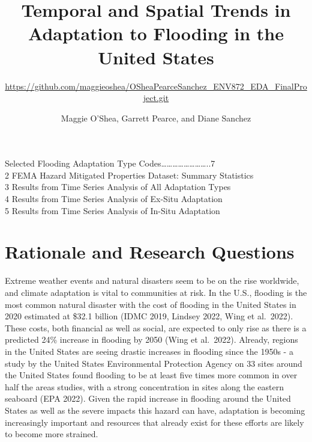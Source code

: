 \documentclass[
  12pt,
]{article}
\title{Temporal and Spatial Trends in Adaptation to Flooding in the
United States}
\subtitle{\url{https://github.com/maggieoshea/OSheaPearceSanchez_ENV872_EDA_FinalProject.git}}
\author{Maggie O'Shea, Garrett Pearce, and Diane Sanchez}
\date{}
\begin{document}
\maketitle

\newpage
\tableofcontents 
\newpage
{}

Selected Flooding Adaptation Type
Codes\ldots\ldots\ldots\ldots\ldots\ldots\ldots\ldots..7\\
2 FEMA Hazard Mitigated Properties Dataset: Summary Statistics\\
3 Results from Time Series Analysis of All Adaptation Types\\
4 Results from Time Series Analysis of Ex-Situ Adaptation\\
5 Results from Time Series Analysis of In-Situ Adaptation \newpage

\listoffigures 
\newpage

\newpage

\hypertarget{rationale-and-research-questions}{%
\section{Rationale and Research
Questions}\label{rationale-and-research-questions}}

Extreme weather events and natural disasters seem to be on the rise
worldwide, and climate adaptation is vital to communities at risk. In
the U.S., flooding is the most common natural disaster with the cost of
flooding in the United States in 2020 estimated at \$32.1 billion (IDMC
2019, Lindsey 2022, Wing et al.~2022). These costs, both financial as
well as social, are expected to only rise as there is a predicted 24\%
increase in flooding by 2050 (Wing et al.~2022). Already, regions in the
United States are seeing drastic increases in flooding since the 1950s -
a study by the United States Environmental Protection Agency on 33 sites
around the United States found flooding to be at least five times more
common in over half the areas studies, with a strong concentration in
sites along the eastern seaboard (EPA 2022). Given the rapid increase in
flooding around the United States as well as the severe impacts this
hazard can have, adaptation is becoming increasingly important and
resources that already exist for these efforts are likely to become more
strained.
\end{document}
